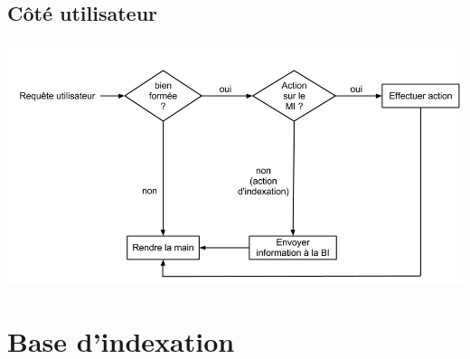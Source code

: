 \documentclass[a4paper,12pt]{report}
\begin{document}
\newpage
\subsection{Côté utilisateur}\label{decision-mi}
\begin{center}
\includegraphics[scale=0.45]{"images/decision_util_mi"}
\end{center}

\section{Base d'indexation}
\end{document}
